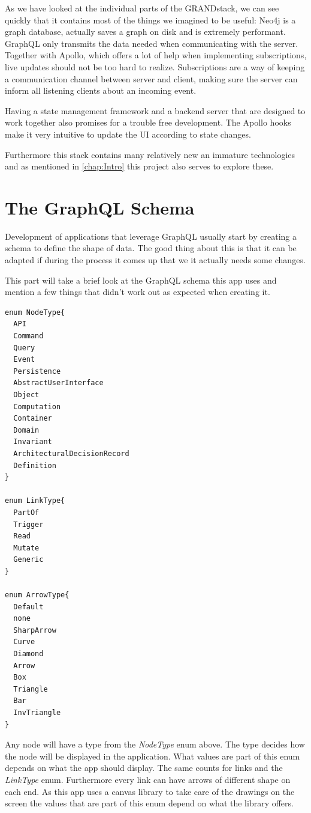 As we have looked at the individual parts of the GRANDstack, we can see quickly that it contains most of the things we imagined to be useful: Neo4j is a graph database, actually saves a graph on disk and is extremely performant. GraphQL only transmits the data needed when communicating with the server. Together with Apollo, which offers a lot of help when implementing subscriptions, live updates should not be too hard to realize. Subscriptions are a way of keeping a communication channel between server and client, making sure the server can inform all listening clients about an incoming event.

Having a state management framework and a backend server that are designed to work together also promises for a trouble free development. The Apollo hooks make it very intuitive to update the UI according to state changes.

Furthermore this stack contains many relatively new an immature technologies and as mentioned in \autoref{chap:Intro} this project also serves to explore these.

\section{The GraphQL Schema}
Development of applications that leverage GraphQL usually start by creating a schema to define the shape of data. The good thing about this is that it can be adapted if during the process it comes up that we it actually needs some changes.

This part will take a brief look at the GraphQL schema this app uses and mention a few things that didn't work out as expected when creating it.
\lstset{language=GraphQL}
\begin{lstlisting}[caption={GraphQL Enums},label={enums}]
enum NodeType{
  API
  Command
  Query
  Event
  Persistence
  AbstractUserInterface
  Object
  Computation
  Container
  Domain
  Invariant
  ArchitecturalDecisionRecord
  Definition
}

enum LinkType{
  PartOf
  Trigger
  Read
  Mutate
  Generic
}

enum ArrowType{
  Default
  none
  SharpArrow
  Curve
  Diamond
  Arrow
  Box
  Triangle
  Bar
  InvTriangle
}
\end{lstlisting}
Any node will have a type from the \emph{NodeType} enum above. The type decides how the node will be displayed in the application. What values are part of this enum depends on what the app should display. The same counts for links and the \emph{LinkType} enum. Furthermore every link can have arrows of different shape on each end. As this app uses a canvas library to take care of the drawings on the screen the values that are part of this enum depend on what the library offers.

